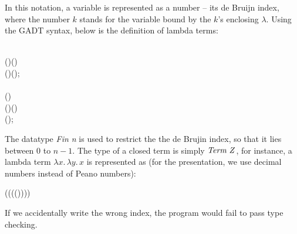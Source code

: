 In this notation, a variable is represented as a number -- its de
Bruijn index, where the number $k$ stands for the variable bound by
the $k$'s enclosing $\lambda$. Using the GADT syntax, below is the
definition of lambda terms:
\begin{hscode}\SaveRestoreHook
{}%
%
%
%
%
%
\>[3]{}\;\mathbin{:}\to \star\mathrel{=}{}\<[E]%
\\
\>[3]{}\<[8]%
\>[8]{}\mathbin{:}(\mathbin{:})\to {}\;(\;){}\<[E]%
\\
\>[3]{}\<[5]%
\>[5]{}\mid {}\<[5E]%
\>[8]{}\mathbin{:}(\mathbin{:})\to {}\;\to {}\;(\;);{}\<[E]%
\\[\blanklineskip]%
\>[3]{}\;\mathbin{:}\to \star\mathrel{=}{}\<[E]%
\\
\>[3]{}\<[8]%
\>[8]{}\mathbin{:}(\mathbin{:})\to {}\;\to {}\;\<[E]%
\\
\>[3]{}\<[5]%
\>[5]{}\mid {}\<[5E]%
\>[8]{}\mathbin{:}(\mathbin{:})\to {}\;(\;)\to {}\;\<[E]%
\\
\>[3]{}\<[5]%
\>[5]{}\mid {}\<[5E]%
\>[8]{}\mathbin{:}(\mathbin{:})\to {}\;\to {}\;\to {}\;;{}\<[E]%
\ColumnHook
\end{hscode}\resethooks
The datatype \emph{Fin n} is used to restrict the the de Brujin index,
so that it lies between $0$ to $n - 1$. The type of a closed term is
simply \ensuremath{\Conid{Term}\;\Conid{Z}}, for instance, a lambda term
$\lambda x.\,\lambda y.\, x$ is represented as (for the presentation,
we use decimal numbers instead of Peano numbers):
\begin{hscode}\SaveRestoreHook
{}%
%
%
\>[3]{}\;\;(\;\;(\;\;(\;\;(\;)))){}\<[E]%
\ColumnHook
\end{hscode}\resethooks
If we accidentally write the wrong index, the program would fail to
pass type checking.


